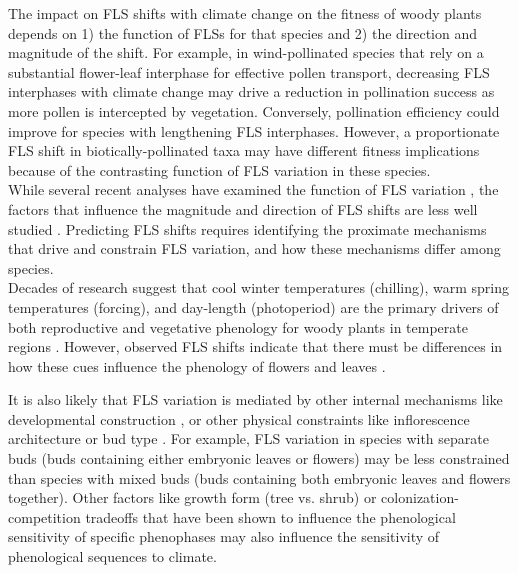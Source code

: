 \documentclass[12pt]{article}\usepackage[]{graphicx}\usepackage[]{color}
\begin{document}
\noindent The impact on FLS shifts with climate change on the fitness of woody plants depends on 1) the function of FLSs for that species and 2) the direction and magnitude of the shift. For example, in wind-pollinated species that rely on a substantial flower-leaf interphase for effective pollen transport, decreasing FLS interphases with climate change may drive a reduction in pollination success as more pollen is intercepted by vegetation. Conversely, pollination efficiency could improve for species with lengthening FLS interphases. However, a proportionate FLS shift in biotically-pollinated taxa may have different fitness implications because of the contrasting function of FLS variation in these species.\\

\noindent While several recent analyses have examined the function of FLS variation \citep[e.g.][]{Buonaiuto2020, Gougherty2018}, the factors that influence the magnitude and direction of FLS shifts are less well studied  \citep[but see][]{Ma2020:aa}. Predicting FLS shifts requires identifying the proximate mechanisms that drive and constrain FLS variation, and how these mechanisms differ among species.\\
 
\noindent Decades of research suggest that cool winter temperatures (chilling), warm spring temperatures (forcing), and day-length (photoperiod) are the primary drivers of both reproductive and vegetative phenology  for woody plants in temperate regions \citep{Korner:2010aa,Flynn2018}. However, observed FLS shifts indicate that there must be differences in how these cues influence the phenology of flowers and leaves \citep{Buonaiuto2020}.

\noindent It is also likely that FLS variation is mediated by other internal mechanisms like developmental construction \citep{Diggle1995}, or other physical constraints like inflorescence architecture or bud type \citep{Pope2013}. For example, FLS variation in species with separate buds (buds containing either embryonic leaves or flowers) may be less constrained than species with mixed buds (buds containing both embryonic leaves and flowers together). Other factors like growth form (tree vs. shrub) or colonization-competition tradeoffs that have been shown to influence the phenological sensitivity of specific phenophases \citep{Basler:2012aa,Donnelly:2021aa} may also influence the sensitivity of phenological sequences to climate.\\
\end{document}

